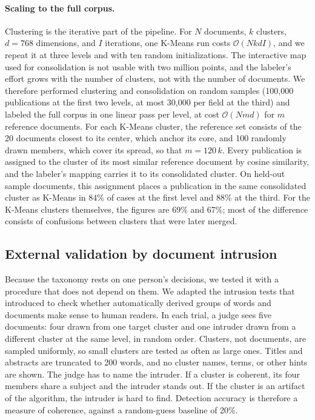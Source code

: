 \documentclass[10pt,twocolumn,a4paper]{article}
\begin{document}
	\paragraph{Scaling to the full corpus.} Clustering is the iterative part of the pipeline. For $N$ documents, $k$ clusters, $d = 768$ dimensions, and $I$ iterations, one K-Means run costs $\mathcal{O}(N k d I)$, and we repeat it at three levels and with ten random initializations. The interactive map used for consolidation is not usable with two million points, and the labeler's effort grows with the number of clusters, not with the number of documents. We therefore performed clustering and consolidation on random samples (100,000 publications at the first two levels, at most 30,000 per field at the third) and labeled the full corpus in one linear pass per level, at cost $\mathcal{O}(N m d)$ for $m$ reference documents. For each K-Means cluster, the reference set consists of the 20 documents closest to its center, which anchor its core, and 100 randomly drawn members, which cover its spread, so that $m = 120\,k$. Every publication is assigned to the cluster of its most similar reference document by cosine similarity, and the labeler's mapping carries it to its consolidated cluster. On held-out sample documents, this assignment places a publication in the same consolidated cluster as K-Means in 84\% of cases at the first level and 88\% at the third. For the K-Means clusters themselves, the figures are 69\% and 67\%; most of the difference consists of confusions between clusters that were later merged.
	
	\subsection{External validation by document intrusion}
	\label{sec:intrusion_method}
	
	Because the taxonomy rests on one person’s decisions, we tested it with a procedure that does not depend on them. We adapted the intrusion tests that \textcite{chang2009reading} introduced to check whether automatically derived groups of words and documents make sense to human readers. In each trial, a judge sees five documents: four drawn from one target cluster and one intruder drawn from a different cluster at the same level, in random order. Clusters, not documents, are sampled uniformly, so small clusters are tested as often as large ones. Titles and abstracts are truncated to 200 words, and no cluster names, terms, or other hints are shown. The judge has to name the intruder. If a cluster is coherent, its four members share a subject and the intruder stands out. If the cluster is an artifact of the algorithm, the intruder is hard to find. Detection accuracy is therefore a measure of coherence, against a random-guess baseline of 20\%.
	
\end{document}
